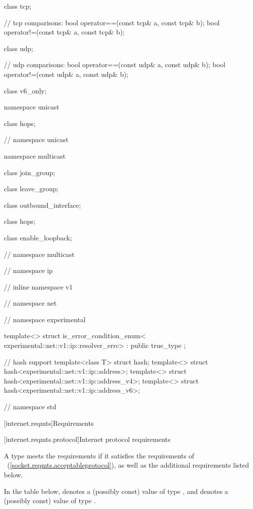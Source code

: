 \begin{codeblock}
{{{{{  class tcp;

  // tcp comparisons:
  bool operator==(const tcp& a, const tcp& b);
  bool operator!=(const tcp& a, const tcp& b);

  class udp;

  // udp comparisons:
  bool operator==(const udp& a, const udp& b);
  bool operator!=(const udp& a, const udp& b);

  class v6_only;

  namespace unicast {

    class hops;

  } // namespace unicast

  namespace multicast {

    class join_group;

    class leave_group;

    class outbound_interface;

    class hops;

    class enable_loopback;

  } // namespace multicast
} // namespace ip
} // inline namespace v1
} // namespace net
} // namespace experimental

  template<> struct is_error_condition_enum<
    experimental::net::v1::ip::resolver_errc>
      : public true_type {};

  // hash support
  template<class T> struct hash;
  template<> struct hash<experimental::net::v1::ip::address>;
  template<> struct hash<experimental::net::v1::ip::address_v4>;
  template<> struct hash<experimental::net::v1::ip::address_v6>;

} // namespace std
\end{codeblock}



[internet.reqmts]{Requirements}


%
%
[internet.reqmts.protocol]{Internet protocol requirements}

\pnum
A type  meets the  requirements if it satisfies the requirements of ~(\ref{socket.reqmts.acceptableprotocol}), as well as the additional requirements listed below.

\pnum
In the table below,  denotes a (possibly const) value of type , and  denotes a (possibly const) value of type .

